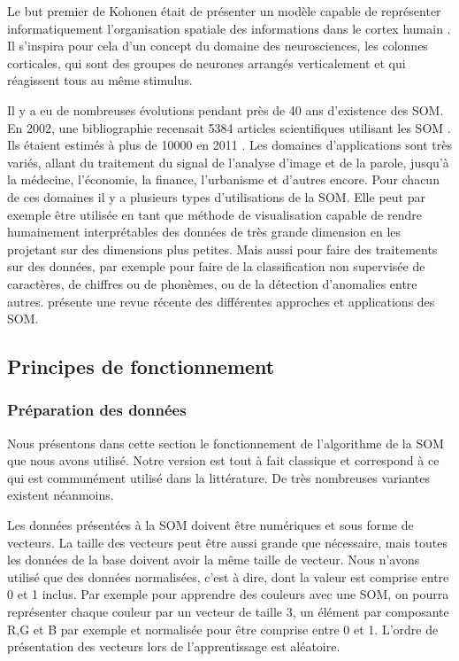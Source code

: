 
	Le but premier de Kohonen était de présenter un modèle capable de représenter informatiquement l'organisation spatiale des informations dans le cortex humain \cite{kohonen-memory}. Il s'inspira pour cela d'un concept du domaine des neurosciences, les colonnes corticales, qui sont des groupes de neurones arrangés verticalement et qui réagissent tous au même stimulus.

	Il y a eu de nombreuses évolutions pendant près de 40 ans d'existence des SOM. En 2002, une bibliographie recensait 5384 articles scientifiques utilisant les SOM \cite{oja2003bibliography}. Ils étaient estimés à plus de 10000 en 2011 \cite{bilbiography-finuni}. Les domaines d'applications sont très variés, allant du traitement du signal de l'analyse d'image et de la parole, jusqu'à la médecine, l'économie, la finance, l'urbanisme et d'autres encore. Pour chacun de ces domaines il y a plusieurs types d'utilisations de la SOM. Elle peut par exemple être utilisée en tant que méthode de visualisation capable de rendre humainement interprétables des données de très grande dimension en les projetant sur des dimensions plus petites. Mais aussi pour faire des traitements sur des données, par exemple pour faire de la classification non supervisée de caractères, de chiffres ou de phonèmes, ou de la détection d'anomalies entre autres. \cite{cottrell2018self} présente une revue récente des différentes approches et applications des SOM. 

\subsection{Principes de fonctionnement}\label{sec:sota:som_fc}
\subsubsection{Préparation des données}

	Nous présentons dans cette section le fonctionnement de l'algorithme de la SOM que nous avons utilisé. Notre version est tout à fait classique et correspond à ce qui est communément utilisé dans la littérature. De très nombreuses variantes existent néanmoins.

	Les données présentées à la SOM doivent être numériques et sous forme de vecteurs. La taille des vecteurs peut être aussi grande que nécessaire, mais toutes les données de la base doivent avoir la même taille de vecteur. Nous n'avons utilisé que des données normalisées, c'est à dire, dont la valeur est comprise entre 0 et 1 inclus. Par exemple pour apprendre des couleurs avec une SOM, on pourra représenter chaque couleur par un vecteur de taille 3, un élément par composante R,G et B par exemple et normalisée pour être comprise entre 0 et 1. L'ordre de présentation des vecteurs lors de l'apprentissage est aléatoire.


